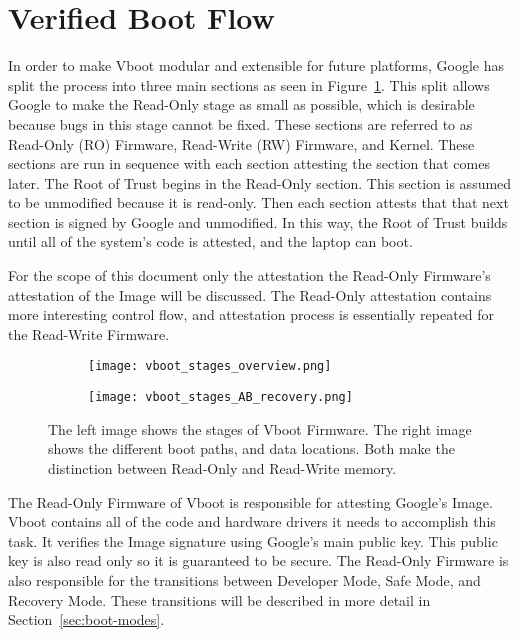 \section{Verified Boot Flow}

In order to make Vboot modular and extensible for future platforms, Google has split the process into three main sections as seen in Figure~\ref{fig:vboot_stages_overview}.
This split allows Google to make the Read-Only stage as small as possible, which
is desirable because bugs in this stage cannot be fixed.
These sections are referred to as Read-Only (RO) Firmware, Read-Write
(RW) Firmware, and Kernel.
These sections are run in sequence with each section attesting the section that comes later.
The Root of Trust begins in the Read-Only section.
This section is assumed to be unmodified because it is read-only.
Then each section attests that that next section is signed by Google and
unmodified. 
In this way, the Root of Trust builds until all of the system's code is
attested, and the laptop can boot.

For the scope of this document only the attestation the Read-Only Firmware's
attestation of the Image will be discussed.
The Read-Only attestation contains more interesting control flow, and
attestation process is essentially repeated for the Read-Write Firmware.

\begin{figure}
\begin{subfigure}{.4\textwidth}
  \centering
  \texttt{[image: vboot\_stages\_overview.png]}
\end{subfigure}
\begin{subfigure}{.60\textwidth}
  \centering
  \texttt{[image: vboot\_stages\_AB\_recovery.png]}
\end{subfigure}
\caption[Verified Boot Stages]{The left image shows the stages of Vboot Firmware. The right image
shows the different boot paths, and data locations. Both make the distinction
between Read-Only and Read-Write memory.}
\label{fig:vboot_stages_overview}
\end{figure}

The Read-Only Firmware of Vboot is responsible for attesting Google's Image. 
Vboot contains all of the code and hardware drivers it needs to accomplish this task.
It verifies the Image signature using Google's main public key.
This public key is also read only so it is guaranteed to be secure.
The Read-Only Firmware is also responsible for the transitions between Developer Mode, Safe Mode, and Recovery Mode.
These transitions will be described in more detail in Section~\ref{sec:boot-modes}.

